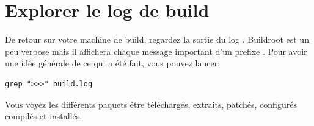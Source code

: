 \section{Explorer le log de build}

De retour sur votre machine de build, regardez la sortie du log .
Buildroot est un peu verbose mais il affichera chaque message important d'un
prefixe \code{>>>}. Pour avoir une idée générale de ce qui a été fait, vous
pouvez lancer:

\begin{verbatim}
grep ">>>" build.log
\end{verbatim}

Vous voyez les différents paquets être téléchargés, extraits, patchés,
configurés compilés et installés.
